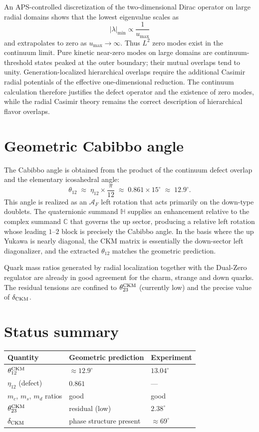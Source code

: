 \documentclass[11pt,a4paper]{article}
\begin{document}
An APS-controlled discretization of the two-dimensional Dirac operator on large radial domains shows that the lowest eigenvalue scales as
\[
|\lambda|_{\min}\propto\frac{1}{u_{\max}}
\]
and extrapolates to zero as $u_{\max}\to\infty$. Thus $L^2$ zero modes exist in the continuum limit. Pure kinetic near-zero modes on large domains are continuum-threshold states peaked at the outer boundary; their mutual overlaps tend to unity. Generation-localized hierarchical overlaps require the additional Casimir radial potentials of the effective one-dimensional reduction. The continuum calculation therefore justifies the defect operator and the existence of zero modes, while the radial Casimir theory remains the correct description of hierarchical flavor overlaps.

\section{Geometric Cabibbo angle}

The Cabibbo angle is obtained from the product of the continuum defect overlap and the elementary icosahedral angle:
\begin{equation}
\theta_{12}\;\approx\;\eta_{12}\times\frac{\pi}{12}\;\approx\;0.861\times 15^\circ\;\approx\;12.9^\circ.
\end{equation}
This angle is realized as an $\mathcal{A}_F$ left rotation that acts primarily on the down-type doublets. The quaternionic summand $\mathbb{H}$ supplies an enhancement relative to the complex summand $\mathbb{C}$ that governs the up sector, producing a relative left rotation whose leading $1$--$2$ block is precisely the Cabibbo angle. In the basis where the up Yukawa is nearly diagonal, the CKM matrix is essentially the down-sector left diagonalizer, and the extracted $\theta_{12}$ matches the geometric prediction.

Quark mass ratios generated by radial localization together with the Dual-Zero regulator are already in good agreement for the charm, strange and down quarks. The residual tensions are confined to $\theta_{23}^{\rm CKM}$ (currently low) and the precise value of $\delta_{\rm CKM}$.

\section{Status summary}

\begin{center}
\begin{tabular}{@{}lll@{}}
\toprule
Quantity & Geometric prediction & Experiment \\
\midrule
$\theta_{12}^{\rm CKM}$ & $\approx 12.9^\circ$ & $13.04^\circ$ \\
$\eta_{12}$ (defect) & $0.861$ & --- \\
$m_c$, $m_s$, $m_d$ ratios & good & good \\
$\theta_{23}^{\rm CKM}$ & residual (low) & $2.38^\circ$ \\
$\delta_{\rm CKM}$ & phase structure present & $\approx 69^\circ$ \\
\bottomrule
\end{tabular}
\end{center}
\end{document}

